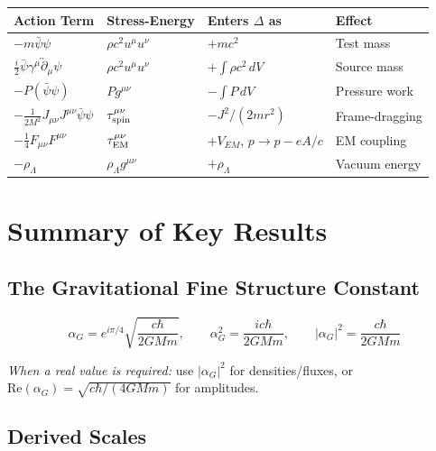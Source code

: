 \documentclass[11pt,a4paper]{article}
\theoremstyle{definition}
\theoremstyle{remark}
\begin{document}
	\begin{center}
		\begin{tabular}{|l|l|l|l|}
			\hline
			\textbf{Action Term} & \textbf{Stress-Energy} & \textbf{Enters $\Delta$ as} & \textbf{Effect} \\
			\hline
			$-m\bar{\psi}\psi$ & $\rho c^2 u^\mu u^\nu$ & $+mc^2$ & Test mass \\
			$\frac{i}{2}\bar{\psi}\gamma^\mu\overleftrightarrow{\partial}_\mu\psi$ & $\rho c^2 u^\mu u^\nu$ & $+\int\rho c^2\,dV$ & Source mass \\
			$-P(\bar{\psi}\psi)$ & $Pg^{\mu\nu}$ & $-\int P\,dV$ & Pressure work \\
			$-\frac{1}{2M^2}J_{\mu\nu}J^{\mu\nu}\bar{\psi}\psi$ & $\tau^{\mu\nu}_{\rm spin}$ & $-J^2/(2mr^2)$ & Frame-dragging \\
			$-\frac{1}{4}F_{\mu\nu}F^{\mu\nu}$ & $\tau^{\mu\nu}_{\rm EM}$ & $+V_{EM}$, $p\to p-eA/c$ & EM coupling \\
			$-\rho_\Lambda$ & $\rho_\Lambda g^{\mu\nu}$ & $+\rho_\Lambda$ & Vacuum energy \\
			\hline
		\end{tabular}
	\end{center}
	
	\section{Summary of Key Results}
	\label{sec:summary_force}
	
	\subsection{The Gravitational Fine Structure Constant}
	
	\begin{equation}
		\boxed{\alpha_G = e^{i\pi/4}\sqrt{\frac{c\hbar}{2GMm}}, \qquad \alpha_G^2 = \frac{ic\hbar}{2GMm}, \qquad |\alpha_G|^2 = \frac{c\hbar}{2GMm}}
	\end{equation}
	
	\emph{When a real value is required:} use $|\alpha_G|^2$ for densities/fluxes, or $\mathrm{Re}(\alpha_G)=\sqrt{c\hbar/(4GMm)}$ for amplitudes.
	
	\subsection{Derived Scales}
	
\end{document}
